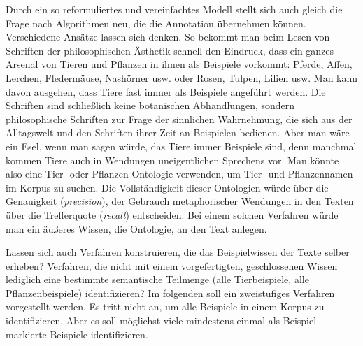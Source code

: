 \documentclass{article}
\newcommand*{\englisch}[1]{\foreignlanguage{english}{\textit{#1}}}%
\renewcommand*{\see}{\autocap{v}gl\adddot}%
\begin{document}
Durch ein so reformuliertes und vereinfachtes Modell stellt sich auch
gleich die Frage nach Algorithmen neu, die die Annotation übernehmen
können. Verschiedene Ansätze lassen sich denken. So bekommt man beim
Lesen von Schriften der philosophischen Ästhetik schnell den Eindruck,
dass ein ganzes Arsenal von Tieren und Pflanzen in ihnen als Beispiele
vorkommt: Pferde, Affen, Lerchen, Fledermäuse, Nashörner usw. oder
Rosen, Tulpen, Lilien usw. Man kann davon ausgehen, dass Tiere fast
immer als Beispiele angeführt werden. Die Schriften sind schließlich
keine botanischen Abhandlungen, sondern philosophische Schriften zur
Frage der sinnlichen Wahrnehmung, die sich aus der Alltagswelt und den
Schriften ihrer Zeit an Beispielen bedienen. Aber man wäre ein Esel,
wenn man sagen würde, das Tiere immer Beispiele sind, denn manchmal
kommen Tiere auch in Wendungen uneigentlichen Sprechens vor. Man
könnte also eine Tier- oder Pflanzen-Ontologie verwenden, um Tier- und
Pflanzennamen im Korpus zu suchen. Die Vollständigkeit dieser
Ontologien würde über die Genauigkeit (\englisch{precision}), der
Gebrauch metaphorischer Wendungen in den Texten über die Trefferquote
(\englisch{recall}) entscheiden. Bei einem solchen Verfahren würde man
ein äußeres Wissen, die Ontologie, an den Text anlegen.

Lassen sich auch Verfahren konstruieren, die das Beispielwissen der
Texte selber erheben? Verfahren, die nicht mit einem vorgefertigten,
geschlossenen Wissen lediglich eine bestimmte semantische Teilmenge
(alle Tierbeispiele, alle Pflanzenbeispiele) identifizieren? Im
folgenden soll ein zweistufiges Verfahren vorgestellt
werden. \Parencite[\see\ jetzt auch][]{CL2019d} Es tritt nicht an, um
alle Beispiele in einem Korpus zu identifizieren. Aber es soll
möglichst viele mindestens einmal als Beispiel markierte Beispiele
identifizieren.
\end{document}
